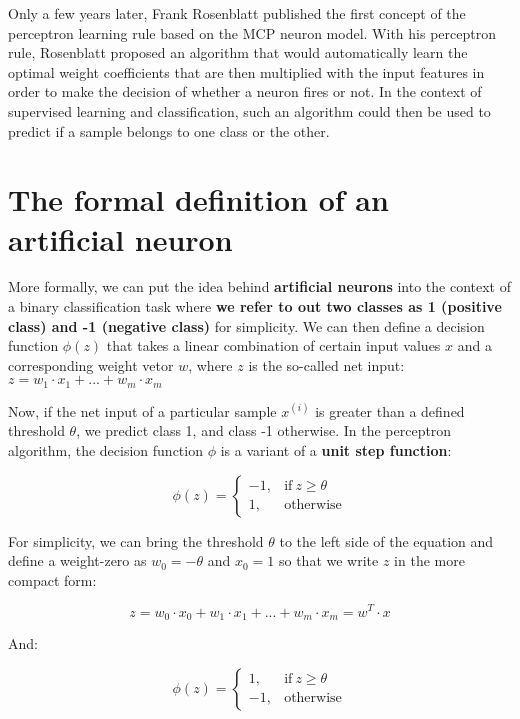 \documentclass[11pt]{article}
\begin{document}
    Only a few years later, Frank Rosenblatt published the first concept of
the perceptron learning rule based on the MCP neuron model. With his
perceptron rule, Rosenblatt proposed an algorithm that would
automatically learn the optimal weight coefficients that are then
multiplied with the input features in order to make the decision of
whether a neuron fires or not. In the context of supervised learning and
classification, such an algorithm could then be used to predict if a
sample belongs to one class or the other.

    \section{The formal definition of an artificial
neuron}\label{the-formal-definition-of-an-artificial-neuron}

    More formally, we can put the idea behind \textbf{artificial neurons}
into the context of a binary classification task where \textbf{we refer
to out two classes as 1 (positive class) and -1 (negative class)} for
simplicity. We can then define a decision function \(\phi(z)\) that
takes a linear combination of certain input values \(x\) and a
corresponding weight vetor \(w\), where \(z\) is the so-called net
input: \(z = w_1 \cdot x_1 + ... + w_m \cdot x_m\)

    Now, if the net input of a particular sample \(x^{(i)}\) is greater than
a defined threshold \(\theta\), we predict class 1, and class -1
otherwise. In the perceptron algorithm, the decision function \(\phi\)
is a variant of a \textbf{unit step function}:

\begin{equation}
\phi(z) = 
\begin{cases}
    -1, & \text{if}\ z \ge \theta \\
    1, & \text{otherwise}
\end{cases}
\end{equation}

    For simplicity, we can bring the threshold \(\theta\) to the left side
of the equation and define a weight-zero as \(w_0 = -\theta\) and
\(x_0 = 1\) so that we write \(z\) in the more compact form:

\[z = w_0 \cdot x_0 + w_1 \cdot x_1 + ... + w_m \cdot x_m = w^T \cdot x\]

And:

\begin{equation}
\phi(z) = 
\begin{cases}
    1, & \text{if}\ z \ge \theta \\
    -1, & \text{otherwise}
\end{cases}
\end{equation}
\end{document}

